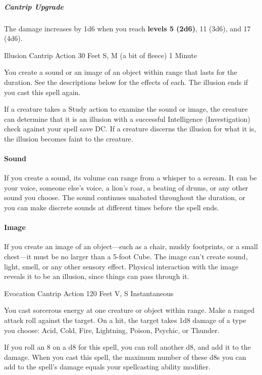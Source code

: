 \documentclass[letterpaper,openany,oneside,twocolumn]{book}
\begin{document}
\subparagraph*{Cantrip Upgrade} The damage increases by 1d6 when you reach \textbf{levels 5 (2d6)}, 11 (3d6), and 17 (4d6).

	{Illusion Cantrip}
	{Action}
	{30 Feet}
	{S, M (a bit of fleece)}
	{1 Minute}

You create a sound or an image of an object within range that lasts for the duration. See the descriptions below for the effects of each. The illusion ends if you cast this spell again.

If a creature takes a Study action to examine the sound or image, the creature can determine that it is an illusion with a successful Intelligence (Investigation) check against your spell save DC. If a creature discerns the illusion for what it is, the illusion becomes faint to the creature.

\paragraph*{Sound} If you create a sound, its volume can range from a whisper to a scream. It can be your voice, someone else's voice, a lion's roar, a beating of drums, or any other sound you choose. The sound continues unabated throughout the duration, or you can make discrete sounds at different times before the spell ends.

\paragraph*{Image} If you create an image of an object—such as a chair, muddy footprints, or a small chest—it must be no larger than a 5-foot Cube. The image can't create sound, light, smell, or any other sensory effect. Physical interaction with the image reveals it to be an illusion, since things can pass through it.

	{Evocation Cantrip}
	{Action}
	{120 Feet}
	{V, S}
	{Instantaneous}

You cast sorcerous energy at one creature or object within range. Make a ranged attack roll against the target. On a hit, the target takes 1d8 damage of a type you choose: Acid, Cold, Fire, Lightning, Poison, Psychic, or Thunder.

If you roll an 8 on a d8 for this spell, you can roll another d8, and add it to the damage. When you cast this spell, the maximum number of these d8s you can add to the spell's damage equals your spellcasting ability modifier.
\end{document}
